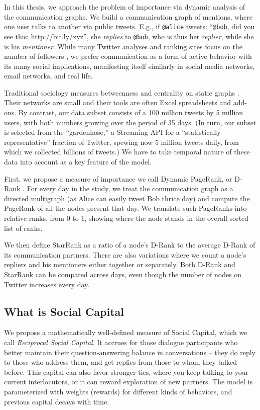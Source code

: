 \documentclass[10pt,oneside]{memoir}
\begin{document}
In this thesis, we approach the problem of importance via dynamic analysis of the communication graphs. We build a communication graph of mentions, where one user talks to another via public tweets. E.g., if \texttt{@alice} tweets: ``\texttt{@bob}, did you see this: http://bit.ly/xyz'', she {\itshape replies} to \texttt{@bob}, who is thus her {\itshape replier}, while she is his {\itshape mentioner}. While many Twitter analyses and ranking sites focus on the number of followers \cite{DBLP:conf/kdd/JavaSFT07}, we prefer communication as a form of active behavior with its many social implications, manifesting itself similarly in social media networks, email networks, and real life.


Traditional sociology measures betweenness and centrality on static graphs \cite{bonacich1987power}. Their networks are small and their tools are often Excel spreadsheets and add-ons. By contrast, our data subset consists of a 100 million tweets by 5 million users, with both numbers growing over the period of 35 days. (In turn, our subset is selected from the ``gardenhose,'' a Streaming API for a ``statistically representative'' fraction of Twitter, spewing now 5 million tweets daily, from which we collected billions of tweets.) We have to take temporal nature of these data into account as a key feature of the model.


First, we propose a measure of importance we call Dynamic PageRank, or D-Rank \cite{Khrabrov:2010:Dynamic}. For every day in the study, we treat the communication graph as a directed multigraph (as Alice can easily tweet Bob thrice day) and compute the PageRank of all the nodes present that day. We translate such PageRanks into relative ranks, from 0 to 1, showing where the node stands in the overall sorted list of ranks.


We then define StarRank as a ratio of a node's D-Rank to the average D-Rank of its communication partners. There are also variations where we count a node's repliers and his mentioners either together or separately. Both D-Rank and StarRank can be compared across days, even though the number of nodes on Twitter increases every day.


\pagebreak \subsection{What is Social Capital}
\label{whatissocialcapital}

We propose a mathematically well-defined measure of Social Capital, which we call {\itshape Reciprocal Social Capital}.  It accrues for those dialogue participants who better maintain their question-answering balance in conversations -- they do reply to those who address them, and get replies from those to whom they talked before. This capital can also favor stronger ties, where you keep talking to your current interlocutors, or it can reward exploration of new partners. The model is parameterized with weights (rewards) for different kinds of behaviors, and previous capital decays with time.
\end{document}
